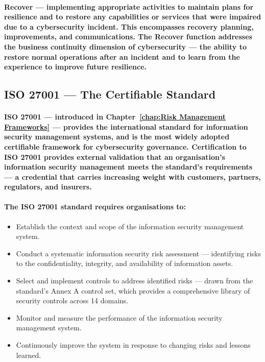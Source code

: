 \paragraph{\textbf{Recover} — implementing appropriate activities to maintain plans for resilience and to restore any capabilities or services that were impaired due to a cybersecurity incident. This encompasses recovery planning, improvements, and communications. The Recover function addresses the business continuity dimension of cybersecurity — the ability to restore normal operations after an incident and to learn from the experience to improve future resilience.}

\subsection{ISO 27001 — The Certifiable Standard}
\paragraph{\textbf{ISO 27001} — introduced in Chapter~\ref{chap:Risk Management Frameworks} — provides the international standard for information security management systems, and is the most widely adopted certifiable framework for cybersecurity governance. Certification to ISO 27001 provides external validation that an organisation's information security management meets the standard's requirements — a credential that carries increasing weight with customers, partners, regulators, and insurers.}
\paragraph{The ISO 27001 standard requires organisations to:}
\begin{itemize}
    \item{Establish the context and scope of the information security management system.}
    \item{Conduct a systematic information security risk assessment — identifying risks to the confidentiality, integrity, and availability of information assets.}
    \item{Select and implement controls to address identified risks — drawn from the standard's Annex A control set, which provides a comprehensive library of security controls across 14 domains.}
    \item{Monitor and measure the performance of the information security management system.}
    \item{Continuously improve the system in response to changing risks and lessons learned.}
\end{itemize}
